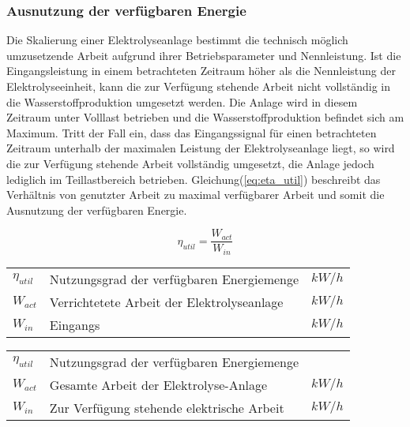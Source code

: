 \documentclass[onecolumn,10pt,titlepage]{article}
\begin{document}
			\subsubsection*{Ausnutzung der verfügbaren Energie}
			Die Skalierung einer Elektrolyseanlage bestimmt die technisch möglich umzusetzende Arbeit aufgrund ihrer Betriebsparameter und Nennleistung. Ist die Eingangsleistung in einem betrachteten Zeitraum höher als die Nennleistung der Elektrolyseeinheit, kann die zur Verfügung stehende Arbeit nicht vollständig in die Wasserstoffproduktion umgesetzt werden. Die Anlage wird in diesem Zeitraum unter Volllast betrieben und die Wasserstoffproduktion befindet sich am Maximum. Tritt der Fall ein, dass das Eingangssignal für einen betrachteten Zeitraum unterhalb der maximalen Leistung der Elektrolyseanlage liegt, so wird die zur Verfügung stehende Arbeit vollständig umgesetzt, die Anlage jedoch lediglich im Teillastbereich betrieben. Gleichung(\ref{eq:eta_util}) beschreibt das Verhältnis von genutzter Arbeit zu maximal verfügbarer Arbeit und somit die Ausnutzung der verfügbaren Energie.

			\begin{equation}
				\eta_{util}=\frac{W_{act}}{W_{in}}
				\label{eq:eta_util}
			\end{equation}

			\begin{table}[H]
				\begin{tabular*}{\textwidth}{lll}\\
					$\eta_{util}$&Nutzungsgrad der verfügbaren Energiemenge&$kW/h$\\
					$W_{act}$&Verrichtetete Arbeit der Elektrolyseanlage&$kW/h$\\
					$W_{in}$&Eingangs&$kW/h$\\

				\end{tabular*}
			\end{table}

			\begin{table}[H]
				\begin{tabular*}{\textwidth}{lll}\\
					$\eta_{util}$&Nutzungsgrad der verfügbaren Energiemenge&\\
					$W_{act}$&Gesamte Arbeit der Elektrolyse-Anlage&$kW/h$\\
					$W_{in}$&Zur Verfügung stehende elektrische Arbeit&$kW/h$\\
				\end{tabular*}
			\end{table}
\end{document}
